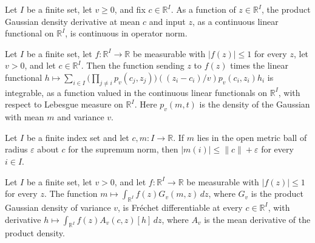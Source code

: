\begin{lemma}
\leanok
{}
Let $I$ be a finite set, let $v\ge 0$, and fix $c\in\mathbb R^I$. As a function of
$z\in\mathbb R^I$, the product Gaussian density derivative at mean $c$ and input $z$, as
a continuous linear functional on $\mathbb R^I$, is continuous in operator norm.
\end{lemma}

\begin{lemma}
\leanok
{}
Let $I$ be a finite set, let $f:\mathbb R^I\to\mathbb R$ be measurable with $|f(z)|\le
1$ for every $z$, let $v>0$, and let $c\in\mathbb R^I$. Then the function sending $z$ to
$f(z)$ times the linear functional $h\mapsto\sum_{i\in I}\bigl(\prod_{j\ne
i}p_v(c_j,z_j)\bigr)((z_i-c_i)/v)p_v(c_i,z_i)h_i$ is integrable, as a function valued in
the continuous linear functionals on $\mathbb R^I$, with respect to Lebesgue measure on
$\mathbb R^I$. Here $p_v(m,t)$ is the density of the Gaussian with mean $m$ and variance
$v$.
\end{lemma}

\begin{lemma}
\leanok
{}
Let $I$ be a finite index set and let $c,m:I\to\mathbb R$. If $m$ lies in the open
metric ball of radius $\varepsilon$ about $c$ for the supremum norm, then $|m(i)|\le
\|c\|+\varepsilon$ for every $i\in I$.
\end{lemma}

\begin{lemma}
\leanok
{}
Let $I$ be a finite set, let $v>0$, and let $f\colon\mathbb R^I\to\mathbb R$ be
measurable with $|f(z)|\le1$ for every $z$. The function $m\mapsto\int_{\mathbb R^I}
f(z)G_v(m,z)\,dz$, where $G_v$ is the product Gaussian density of variance $v$, is
Fréchet differentiable at every $c\in\mathbb R^I$, with derivative
$h\mapsto\int_{\mathbb R^I} f(z)A_v(c,z)[h]\,dz$, where $A_v$ is the mean derivative of
the product density.
\end{lemma}

